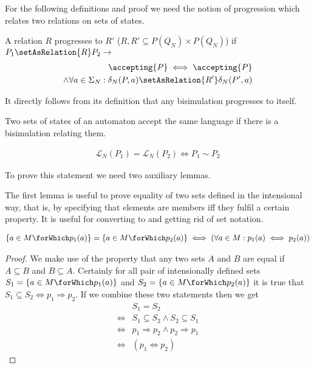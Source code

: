 For the following definitions and proof we need the notion of progression which
  relates two relations on sets of states.

\begin{definition}
  A relation $R$ progresses to $R'$
    ($R, R' \subseteq \mathit{P}(Q_N) \times \mathit{P}(Q_N)$)
    if $P_1 \setAsRelation{R} P_2 \to$
  \begin{align*}
    \accepting{P} \iff \accepting{P}\\
    \land \forall a \in \Sigma_N: \delta_N(P, a) \setAsRelation{R'} \delta_N(P', a)
  \end{align*}
\end{definition}

It directly follows from its definition that any bisimulation progresses to itself.

\begin{theorem}
  Two sets of states of an automaton accept the same language
    if there is a bisimulation relating them.

  \begin{align*}
    \mathcal{L}_N(P_1) = \mathcal{L}_N(P_2) \iff P_1 \sim P_2
  \end{align*}
\end{theorem}

To prove this statement we need two auxiliary lemmas.

The first lemma is useful to prove equality of two sets defined in the
  intensional way, that is, by specifying that elements are members iff they
  fulfil a certain property.
It is useful for converting to and getting rid of set notation.

\begin{lemma}
  \begin{align*}
    \{ a \in M \forWhich p_1(a) \} = \{ a \in M \forWhich p_2(a)\} \iff (\forall a \in M: p_1(a) \iff p_2(a))
  \end{align*}
\end{lemma}

\begin{proof}
  We make use of the property that any two sets $A$ and $B$ are equal if
    $A \subseteq B$ and $B \subseteq A$.
  Certainly for all pair of intensionally defined sets
    $S_1 = \{a \in M \forWhich p_1(a)\}$ and
    $S_2 = \{a \in M \forWhich p_2(a)\}$ it is true that
    $S_1 \subseteq S_2 \iff p_1 \Rightarrow p_2$.
  If we combine these two statements then we get
  \begin{align*}
         &S_1 = S_2\\
    \iff &S_1 \subseteq S_2 \land S_2 \subseteq S_1\\
    \iff &p_1 \Rightarrow p_2 \land p_2 \Rightarrow p_1\\
    \iff &(p_1 \iff p_2)
  \end{align*}
\end{proof}

